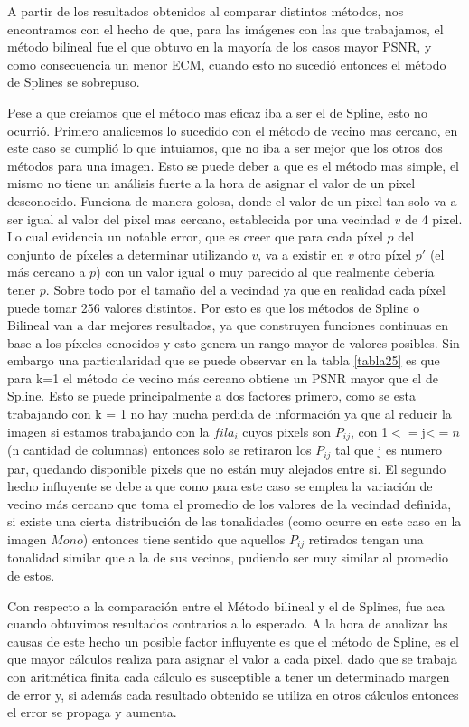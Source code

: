 \documentclass[a4paper]{article}
\newcounter{col}
\begin{document}
A partir de los resultados obtenidos al comparar distintos métodos, nos encontramos con el hecho de que, para las imágenes con las que trabajamos, el método bilineal fue el que obtuvo en la mayoría de los casos mayor PSNR, y como consecuencia un menor ECM, cuando esto no sucedió entonces el método de Splines se sobrepuso. 

Pese a que creíamos que el método mas eficaz iba a ser el de Spline, esto no ocurrió. 
Primero analicemos lo sucedido con el método de vecino mas cercano, en este caso se cumplió lo que intuiamos, que no iba a ser mejor que los otros dos métodos para una imagen. Esto se puede deber a que es el método mas simple, el mismo no tiene un análisis fuerte a la hora de asignar el valor de un pixel desconocido. Funciona de manera golosa, donde el valor de un pixel tan solo va a ser igual al valor del pixel mas cercano, establecida por una vecindad $v$ de 4 pixel. Lo cual evidencia un notable error, que es creer que para cada píxel $p$ del conjunto de píxeles a determinar utilizando $v$, va a existir en $v$ otro píxel $p'$ (el más cercano a $p$) con un valor igual o muy parecido al que realmente debería tener $p$. Sobre todo por el tamaño del a vecindad ya que en realidad cada píxel puede tomar 256 valores distintos. Por esto es que los métodos de Spline o Bilineal van a dar mejores resultados, ya que construyen funciones continuas en base a los píxeles conocidos y esto genera un rango mayor de valores posibles. Sin embargo una particularidad que se puede observar en la tabla \ref{tabla25} es que para k=1 el m\'etodo de vecino m\'as cercano obtiene un PSNR mayor que el de Spline. Esto se puede principalmente a dos factores primero, como se esta trabajando con k = 1 no hay mucha perdida de información ya que al reducir la imagen si estamos trabajando con la $fila_i$ cuyos pixels son $P_{ij}$, con 1$<=$j<$=n$ (n cantidad de columnas) entonces solo se retiraron los $P_{ij}$ tal que j es numero par, quedando disponible pixels que no están muy alejados entre si. El  segundo hecho influyente se debe a que como para este caso se emplea la variación de vecino m\'as cercano que toma el promedio de los valores de la vecindad definida, si existe una cierta distribución de las tonalidades (como ocurre en este caso en la imagen $Mono$) entonces tiene sentido que aquellos $P_{ij}$ retirados tengan una tonalidad similar que a la de sus vecinos, pudiendo ser muy similar al promedio de estos. 
\par Con respecto a la comparación entre el Método bilineal y el de Splines, fue aca cuando obtuvimos resultados contrarios a lo esperado. A la hora de analizar las causas de este hecho un posible factor influyente es que el método de Spline, es el que mayor cálculos realiza para asignar el valor a cada pixel, dado que se trabaja con aritmética finita cada c\'alculo es susceptible a tener un determinado margen de error y, si además cada resultado obtenido se utiliza en otros cálculos entonces el error se propaga y aumenta.  
\end{document}
